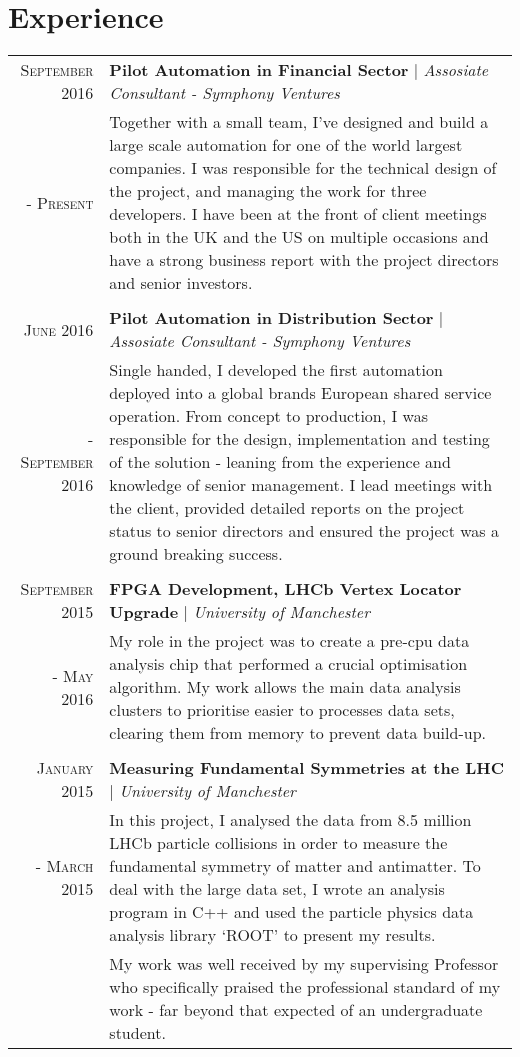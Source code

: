 \documentclass[a4paper,11pt]{article}
\begin{document}
\section{Experience}
\begin{tabular}{r|p{12.5cm}}
    \textsc{September 2016} & \textbf{Pilot Automation in Financial Sector} | \emph{Assosiate Consultant - Symphony Ventures}\\
    \textsc{ - Present} & \footnotesize{Together with a small team, I've designed and build a large scale automation for one of the world largest companies. I was responsible for the technical design of the project, and managing the work for three developers. I have been at the front of client meetings both in the UK and the US on multiple occasions and have a strong business report with the project directors and senior investors.}\\
    \multicolumn{2}{c}{}\\

    \textsc{June 2016} & \textbf{Pilot Automation in Distribution Sector} | \emph{Assosiate Consultant - Symphony Ventures}\\
    \textsc{ - September 2016} & \footnotesize{Single handed, I developed the first automation deployed into a global brands European shared service operation. From concept to production, I was responsible for the design, implementation and testing of the solution - leaning from the experience and knowledge of senior management. I lead meetings with the client, provided detailed reports on the project status to senior directors and ensured the project was a ground breaking success.}\\
        \multicolumn{2}{c}{}\\    
    
    \textsc{September 2015}
        & \textbf{FPGA Development, LHCb Vertex Locator Upgrade} | \emph{University of Manchester}\\
    \textsc{ - May 2016}
        & \footnotesize{My role in the project was to create a pre-cpu data analysis chip that performed a crucial optimisation algorithm. My work allows the main data analysis clusters to prioritise easier to processes data sets, clearing them from memory to prevent data build-up.}\\
    
        \multicolumn{2}{c}{}\\
    \textsc{January 2015}
        & \textbf{Measuring Fundamental Symmetries at the LHC} | \emph{University of Manchester}\\
    \textsc{- March 2015}
        & \footnotesize{In this project, I analysed the data from 8.5 million LHCb particle collisions in order to measure the fundamental symmetry of matter and antimatter. To deal with the large data set, I wrote an analysis program in C++ and used the particle physics data analysis library `ROOT' to present my results.}\\
        & \footnotesize{My work was well received by my supervising Professor who specifically praised the professional standard of my work - far beyond that expected of an undergraduate student.}
        \multicolumn{2}{c}{}\\


\end{tabular}
\end{document}
